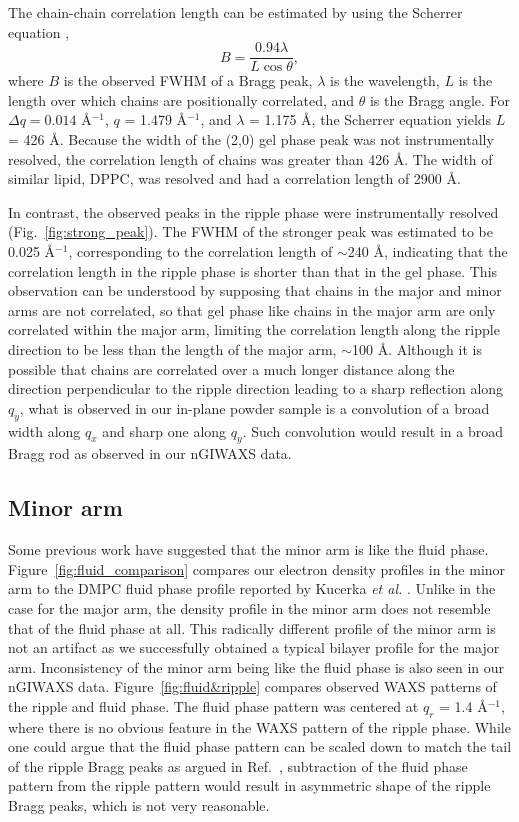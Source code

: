 The chain-chain correlation length can be estimated by using the Scherrer equation 
\cite{ref:Warren69},
\[
  B = \frac{0.94\lambda}{L\cos\theta},
\]
where $B$ is the observed FWHM of a Bragg peak, $\lambda$ is the wavelength,
$L$ is the length over which chains are positionally correlated, 
and $\theta$ is the Bragg angle. For $\Delta q = 0.014$ \AA$^{-1}$,
$q$ = 1.479 \AA$^{-1}$, and $\lambda$ = 1.175 \AA, the 
Scherrer equation yields $L$ = 426 \AA. 
Because the width of the (2,0) gel phase peak 
was not instrumentally resolved, the correlation length of chains was 
greater than 426 \AA.
The width of similar lipid, DPPC, was resolved and had a correlation 
length of 2900 \AA \cite{ref:Sun94}.

In contrast, the observed peaks in the ripple phase were instrumentally 
resolved (Fig.~\ref{fig:strong_peak}). 
The FWHM of the stronger peak was estimated to be 0.025 \AA$^{-1}$,
corresponding to the correlation length of $\sim$240 \AA,
indicating that the correlation length in the ripple phase is shorter 
than that in the gel phase.
This observation can be understood by supposing that chains in the major
and minor arms are not correlated, so that gel phase like chains in the 
major arm are only correlated within the major arm, limiting the correlation
length along the ripple direction to be less than the length of the major 
arm, $\sim$100 \AA. Although
it is possible that chains are correlated over a much longer distance 
along the direction perpendicular to the ripple direction leading to
a sharp reflection along $q_y$,
what is observed in our in-plane powder sample is a convolution
of a broad width along $q_x$ and sharp one along $q_y$. Such convolution
would result in a broad Bragg rod as observed in our nGIWAXS data. 

\subsection{Minor arm}
Some previous work have suggested that the minor arm is like the fluid phase.
Figure~\ref{fig:fluid_comparison} compares our electron density profiles
in the minor arm to the DMPC fluid phase profile reported by 
Kucerka \textit{et al.} \cite{Kucerka05_BPJ}.
Unlike in the case for the major arm, the density profile in the minor arm
does not resemble that of the fluid phase at all. This radically different
profile of the minor arm is not an artifact as we successfully obtained 
a typical bilayer profile for the major arm.
Inconsistency of the minor arm being like the fluid phase is also seen in our nGIWAXS data.
Figure~\ref{fig:fluid&ripple} compares observed WAXS patterns of the ripple and 
fluid phase. The fluid phase pattern was centered at $q_r$ = 1.4 \AA$^{-1}$, where
there is no obvious feature in the WAXS pattern of the ripple phase. While one
could argue that the fluid phase pattern can be scaled down to match the tail
of the ripple Bragg peaks as argued in Ref.~\cite{ref:Cunningham98}, 
subtraction of the fluid phase pattern from the ripple pattern would result
in asymmetric shape of the ripple Bragg peaks, which is not very reasonable.

